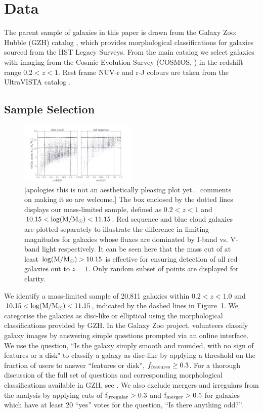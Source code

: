\documentclass[useAMS,usenatbib]{mn2e}
\begin{document}
\section{Data}
\label{sec:Data}

The parent sample of galaxies in this paper is drawn from the Galaxy Zoo: Hubble (GZH) catalog \citep{Willett2016}, which provides morphological classifications for galaxies sourced from the HST Legacy Surveys. From the main catalog we select galaxies with imaging from the Cosmic Evolution Survey (COSMOS, \citet{Scoville2007}) in the redshift range $0.2<z<1$.  Rest frame NUV-r and r-J colours are taken from the UltraVISTA catalog \citep{McCracken2012,Ilbert2013}.

\subsection{Sample Selection}
\label{sec:sampleselection}

\begin{figure}
\centering
\includegraphics[width=0.5\textwidth]{figures/mass_selection.pdf}
\caption{[apologies this is not an aesthetically pleasing plot yet... comments on making it so are welcome.] The box enclosed by the dotted lines displays our mass-limited sample, defined as $0.2<z<1$ and $10.15<\rm \log(M/M_{\odot})<11.15$. Red sequence and blue cloud galaxies are plotted separately to illustrate the difference in limiting magnitudes for galaxies whose fluxes are dominated by I-band vs. V-band light respectively. It can be seen here that the mass cut of at least $\rm \log(M/M_{\odot})>10.15$ is effective for ensuring detection of all red galaxies out to $z=1$. Only random subset of points are displayed for clarity.}
\label{masscut}
\end{figure}

We identify a mass-limited sample of 20,811 galaxies within $0.2<z<1.0$ and $10.15<\rm \log(M/M_{\odot})<11.15$, indicated by the dashed lines in Figure~\ref{masscut}. We categorise the galaxies as disc-like or elliptical using the morphological classifications provided by GZH. In the Galaxy Zoo project, volunteers classify galaxy images by answering simple questions prompted via an online interface. We use the question, ``Is the galaxy simply smooth and rounded, with no sign of features or a disk" to classify a galaxy as disc-like by applying a threshold on the fraction of users to answer ``features or disk'', $f_{\rm features}\ge0.3$. For a thorough discussion of the full set of questions and corresponding morphological classifications available in GZH, see \citet{Willett2016}. We also exclude mergers and irregulars from the analysis by applying cuts of $\rm f_{irregular} > 0.3$ and $\rm f_{merger} > 0.5$ for galaxies which have at least 20 ``yes'' votes for the question, ``Is there anything odd?''. 
\end{document}
